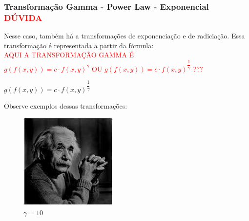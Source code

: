 \documentclass[a4paper, 12pt]{article}
\begin{document}
\subsubsection{Transformação Gamma - Power Law - Exponencial  \textcolor{red}{DÚVIDA}}
Nesse caso, também há a transformações de exponenciação e de radiciação. Essa transformação é representada a partir da fórmula:
\\
\large{\textcolor{red}{AQUI A TRANSFORMAÇÃO GAMMA É \\ $g(f(x,y)) = c \cdot f(x,y)^{\gamma}$ OU $g(f(x,y)) = c \cdot f(x,y)^{\dfrac{1}{\gamma}}$ ???}}
\begin{center}
	$g(f(x,y)) = c \cdot f(x,y)^{\dfrac{1}{\gamma}}$
\end{center}
Observe exemplos dessas transformações:
\begin{figure}[!htb]
	\centering
	  	\includegraphics[width=\linewidth]{images/einsteinEscuro.jpg}
	  	\caption{$\gamma = 10$}
	\endminipage\hspace{1cm}

\end{figure}
\end{document}
